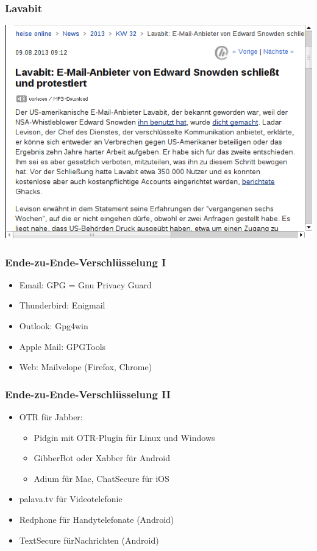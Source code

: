 \documentclass[12pt]{beamer}
\begin{document}
\begin{frame}
    \frametitle{Lavabit}
    \includegraphics[height=0.6\textheight]{img/heise_lavabit.png}
\end{frame}

\begin{frame}
    \frametitle{Ende-zu-Ende-Verschlüsselung I}
    \begin{itemize}\Large
      \item Email: GPG = Gnu Privacy Guard
      \item Thunderbird: Enigmail
      \item Outlook: Gpg4win
      \item Apple Mail: GPGTools
      \item Web: Mailvelope (Firefox, Chrome)
    \end{itemize}
\end{frame}

\begin{frame}
  \frametitle{Ende-zu-Ende-Verschlüsselung II}
  \begin{itemize}
    \item<2-> OTR für Jabber:
      \begin{itemize}
        \item Pidgin mit OTR-Plugin für Linux und Windows
        \item GibberBot oder Xabber für Android
        \item Adium für Mac, ChatSecure für iOS
      \end{itemize}
    \item<3-> palava.tv für Videotelefonie
    \item<4-> Redphone für Handytelefonate (Android)
    \item<5-> TextSecure fürNachrichten (Android)
  \end{itemize}
\end{frame}
\end{document}
